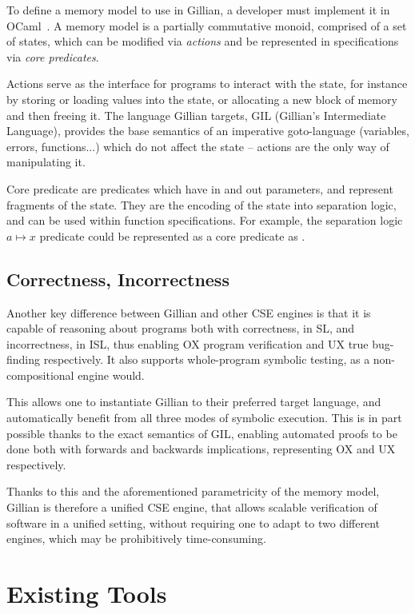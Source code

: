 To define a memory model to use in Gillian, a developer must implement it in OCaml~\cite{ocaml}. A memory model is a partially commutative monoid, comprised of a set of states, which can be modified via \emph{actions} and be represented in specifications via \emph{core predicates}.

Actions serve as the interface for programs to interact with the state, for instance by storing or loading values into the state, or allocating a new block of memory and then freeing it. The language Gillian targets, GIL (Gillian's Intermediate Language), provides the base semantics of an imperative goto-language (variables, errors, functions...) which do not affect the state -- actions are the only way of manipulating it.

Core predicate are predicates which have in and out parameters, and represent fragments of the state. They are the encoding of the state into separation logic, and can be used within function specifications. For example, the separation logic $a \mapsto x$ predicate could be represented as a core predicate as .

\subsection{Correctness, Incorrectness}

Another key difference between Gillian and other CSE engines is that it is capable of reasoning about programs both with correctness, in SL, and incorrectness, in ISL, thus enabling OX program verification and UX true bug-finding respectively. It also supports whole-program symbolic testing, as a non-compositional engine would.

This allows one to instantiate Gillian to their preferred target language, and automatically benefit from all three modes of symbolic execution. This is in part possible thanks to the exact \cite{exactsl} semantics of GIL, enabling automated proofs to be done both with forwards and backwards implications, representing OX and UX respectively.

Thanks to this and the aforementioned parametricity of the memory model, Gillian is therefore a unified CSE engine, that allows scalable verification of software in a unified setting, without requiring one to adapt to two different engines, which may be prohibitively time-consuming.

\section{Existing Tools} \label{sec:existing-tools}

